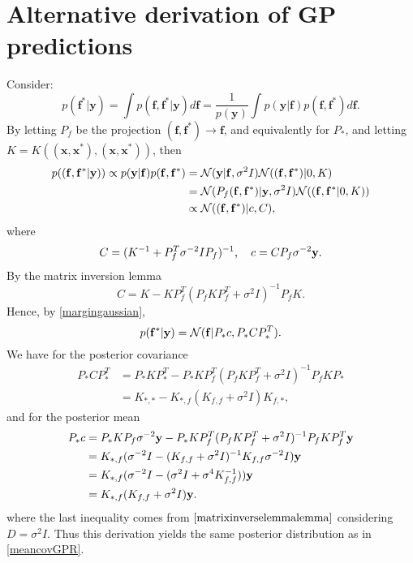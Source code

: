 \chapter{Alternative derivation of GP predictions}\label{alternativegpsection}

Consider:
\begin{equation} \label{GPRalternativeAppendix}
p(\mathbf{f}^*|\mathbf{y}) = \int p(\mathbf{f},\mathbf{f}^*|\mathbf{y}) d \mathbf{f} 
= \frac{1}{p(\mathbf{y})} \int p(\mathbf{y}|\mathbf{f}) p(\mathbf{f},\mathbf{f}^*) d \mathbf{f}.
\end{equation}
By letting $P_f$ be the projection $(\mathbf{f},\mathbf{f}^*) \to \mathbf{f}$, and equivalently for $P_*$, and letting $K = K((\mathbf{x},\mathbf{x}^*),(\mathbf{x},\mathbf{x}^*))$, then
\begin{equation}
\begin{split}
 p(({\mathbf f},{\mathbf f}^*|{\mathbf y})) \propto p(\mathbf{y}|\mathbf{f}) p(\mathbf{f},\mathbf{f}^*) & = 
  \mathcal{N}({\mathbf y}|{\mathbf f},\sigma^2 I) \mathcal{N}(({\mathbf f},{\mathbf f}^*)|0,K) \\
 & = \mathcal{N}(P_f({\mathbf f},{\mathbf f}^*)|{\mathbf y},\sigma^2 I) \mathcal{N}(({\mathbf f},{\mathbf f}^*|0,K)) \\
 & \propto \mathcal{N}(({\mathbf f},{\mathbf f}^*)|c,C),
\end{split}
\end{equation}
where
\begin{equation}
 C = (K^{-1} + P_f^T \sigma^{-2} I P_f)^{-1}, \quad c = C P_f \sigma^{-2} {\mathbf y}.
\end{equation}
By the matrix inversion lemma
\begin{equation}
 C = K - K P_f^T (P_f K P_f^T + \sigma^2 I)^{-1} P_f K.
\end{equation}
Hence, by \eqref{margingaussian},
\begin{equation}
 p({\mathbf f}^*|{\mathbf y}) = \mathcal{N}({\mathbf f}|P_* c,P_* C P_*^T).
\end{equation}
We have for the posterior covariance
\begin{equation}
\begin{split}
 P_* C P_*^T & = P_* K P_*^T - P_* K P_f^T (P_f K P_f^T + \sigma^2 I)^{-1} P_f K P_* \\
 & = K_{*,*} - K_{*,f} (K_{f,f} + \sigma^2 I) K_{f,*},
 \end{split}
\end{equation}
and for the posterior mean
\begin{equation}
\begin{split}
 P_* c & = P_* K P_f \sigma^{-2} {\mathbf y} - P_* K P_f^T (P_f K P_f^T + \sigma^2 I)^{-1} P_f K P_f^T {\mathbf y} \\
 & = K_{*,f} (\sigma^{-2} I - (K_{f,f} + \sigma^2 I)^{-1} K_{f,f} \sigma^{-2} I) {\mathbf y} \\
 & = K_{*,f} (\sigma^{-2} I - (\sigma^2 I + \sigma^4 K_{f,f}^{-1})) {\mathbf y} \\
 & = K_{*,f} (K_{f,f} + \sigma^2 I)  {\mathbf y}.
 \end{split}
\end{equation}
where the last inequality comes from $\eqref{matrixinverselemmalemma}$ considering $D = \sigma^2 I$. Thus this derivation yields the same posterior distribution as in \eqref{meancovGPR}.

